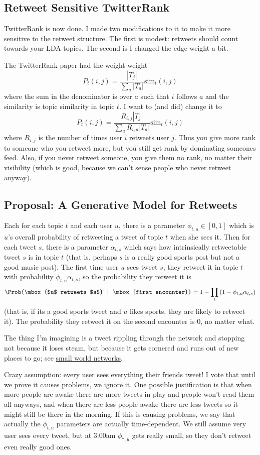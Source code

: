 \subsection*{Retweet Sensitive TwitterRank}

TwitterRank is now done.
I made two modifications to it to make it more sensitive to the retweet structure.
The first is modest: retweets should count towards your LDA topics.
The second is I changed the edge weight a bit.

The TwitterRank paper had the weight weight
\[P_t(i,j) = \frac{|T_j|}{\sum_a |T_a|}\mbox{sim}_t(i,j)\]
where the sum in the denominator is over $a$ such that $i$ follows $a$ and the similarity is topic similarity in topic $t$.
I want to (and did) change it to
\[P_t(i,j) = \frac{R_{i,j}|T_j|}{\sum_a R_{i,a}|T_a|}\mbox{sim}_t(i,j)\]
where $R_{i,j}$ is the number of times user $i$ retweets user $j$.
Thus you give more rank to someone who you retweet more, but you still get rank by dominating someones feed.
Also, if you never retweet someone, you give them no rank, no matter their visibility (which is good, because we can't sense people who never retweet anyway).  

\subsection*{Proposal: A Generative Model for Retweets}

Each for each topic $t$ and each user $u$, there is a parameter $\phi_{t,u}\in[0,1]$ which is $u$'s overall probability of retweeting a tweet of topic $t$ when she sees it.
Then for each tweet $s$, there is a parameter $\alpha_{t,s}$ which says how intrinsically retweetable tweet $s$ is in topic $t$ (that is, perhaps $s$ is a really good sports post but not a good music post).  
The first time user $u$ sees tweet $s$, they retweet it in topic $t$ with probability $\phi_{t,u}\alpha_{t,s}$, so the probability they retweet it is
\[\Prob{\mbox{$u$ retweets $s$} | \mbox{first encounter}} = 1-\prod_t\left(1- \phi_{t,u}\alpha_{t,s}\right)\]
(that is, if its a good sports tweet and $u$ likes sports, they are likely to retweet it).
The probability they retweet it on the second encounter is 0, no matter what.  

The thing I'm imagining is a tweet rippling through the network and stopping not because it loses steam, but because it gets cornered and runs out of new places to go; see \href{http://en.wikipedia.org/wiki/Small-world_network}{small world networks}.  

Crazy assumption:  every user sees everything their friends tweet!  
I vote that until we prove it causes problems, we ignore it.
One possible justification is that when more people are awake there are more tweets in play and people won't read them all anyways, and when there are less people awake there are less tweets so it might still be there in the morning.  
If this is causing problems, we say that actually the $\phi_{t,u}$ parameters are actually time-dependent.  
We still assume very user sees every tweet, but at 3:00am $\phi_{*,u}$ gets really small, so they don't retweet even really good ones.  

